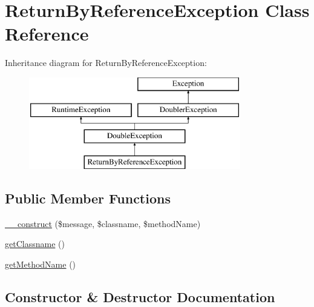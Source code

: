 \hypertarget{class_prophecy_1_1_exception_1_1_doubler_1_1_return_by_reference_exception}{}\section{Return\+By\+Reference\+Exception Class Reference}
\label{class_prophecy_1_1_exception_1_1_doubler_1_1_return_by_reference_exception}
Inheritance diagram for Return\+By\+Reference\+Exception\+:\begin{figure}[H]
\begin{center}
\leavevmode
\includegraphics[height=4.000000cm]{class_prophecy_1_1_exception_1_1_doubler_1_1_return_by_reference_exception}
\end{center}
\end{figure}
\subsection*{Public Member Functions}
\begin{DoxyCompactItemize}
\item 
\mbox{\hyperlink{class_prophecy_1_1_exception_1_1_doubler_1_1_return_by_reference_exception_af99c7a864e6a5e500a468c1c9c731985}{\+\_\+\+\_\+construct}} (\$message, \$classname, \$method\+Name)
\item 
\mbox{\hyperlink{class_prophecy_1_1_exception_1_1_doubler_1_1_return_by_reference_exception_a2de0f0e912c2f4137ae5ce2687ef8fc5}{get\+Classname}} ()
\item 
\mbox{\hyperlink{class_prophecy_1_1_exception_1_1_doubler_1_1_return_by_reference_exception_a0fa2079426d0262e759c4105fa4e9163}{get\+Method\+Name}} ()
\end{DoxyCompactItemize}


\subsection{Constructor \& Destructor Documentation}
\mbox{\label{class_prophecy_1_1_exception_1_1_doubler_1_1_return_by_reference_exception_af99c7a864e6a5e500a468c1c9c731985}} 
